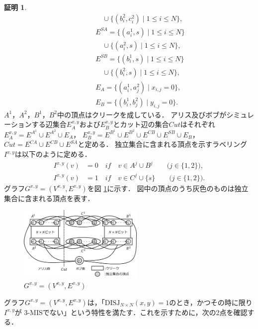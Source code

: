 \documentclass[11pt,a4paper]{jarticle}
\theoremstyle{definition}
\newtheorem*{prf*}{証明}
\begin{document}
\begin{prf*}
\begin{align*}
&\phantom{=} \quad \quad \cup \{(b^{2}_{i}, c^{2}_{i}) \mid 1\leq i \leq N\}, \\
&\phantom{=} \quad E^{SA} = \{(a^{1}_{i}, s) \mid 1\leq i \leq N\} \\
&\phantom{=} \quad \quad \cup \{(a^{2}_{i}, s) \mid 1\leq i \leq N\}, \\
&\phantom{=} \quad E^{SB} = \{(b^{1}_{i}, s) \mid 1\leq i \leq N\} \\
&\phantom{=} \quad \quad \cup \{(b^{2}_{i}, s) \mid 1\leq i \leq N\}, \\
&\phantom{=} \quad E_{A} = \{(a^{1}_{i},a^{2}_{j}) \mid x_{i,j}=0\}, \\
&\phantom{=} \quad E_{B} = \{(b^{1}_{i},b^{2}_{j}) \mid y_{i,j}=0\}.
\end{align*}
$A^{1}$，$A^{2}$，$B^{1}$，$B^{2}$中の頂点はクリークを成している．
アリス及びボブがシミュレーションする辺集合$E^{x,y}_A$および$E^{x,y}_B$とカット辺の集合$\mathit{Cut}$はそれぞれ
$E^{x,y}_{A} = E^{A^{1}} \cup E^{A^{2}} \cup E_{A}$，
$E^{x,y}_{B} = E^{B^{1}} \cup E^{B^{2}} \cup E^{CB} \cup E^{SB} \cup E_{B}$，
$\mathit{Cut} = E^{CA} \cup E^{CB} \cup E^{SA}$と定める．
独立集合に含まれる頂点を示すラベリング$I^{x,y}$は以下のように定める．
\begin{align*}
I^{x,y}(v) &= 0 \quad if \quad v \in A^{j} \cup B^{j} \quad \quad \text{($j \in \{1, 2\}$)}, \\
I^{x,y}(v) &= 1 \quad if \quad v \in C^{j} \cup \{s\} \quad \quad \text{($j \in \{1, 2\}$)}.
\end{align*}
グラフ$G^{x, y} = (V^{x,y}, E^{x,y})$を図 \ref{3_G(x,y)}に示す．
図中の頂点のうち灰色のものは独立集合に含まれる頂点を表す．
\begin{figure}[ht]
\begin{center}
\includegraphics[width=60mm]{3_Gxy.png}
\end{center}
\caption{$G^{x, y} = (V^{x,y}, E^{x,y})$}
\label{3_G(x,y)}
\end{figure}
グラフ$G^{x, y} = (V^{x,y}, E^{x,y})$は，「$\mathrm{DISJ}_{N \times N} (x, y) = 1$のとき，かつその時に限り$I^{x,y}$が
3-MISでない」という特性を満たす．これを示すために，次の2点を確認する． \\

\end{prf*}
\end{document}
